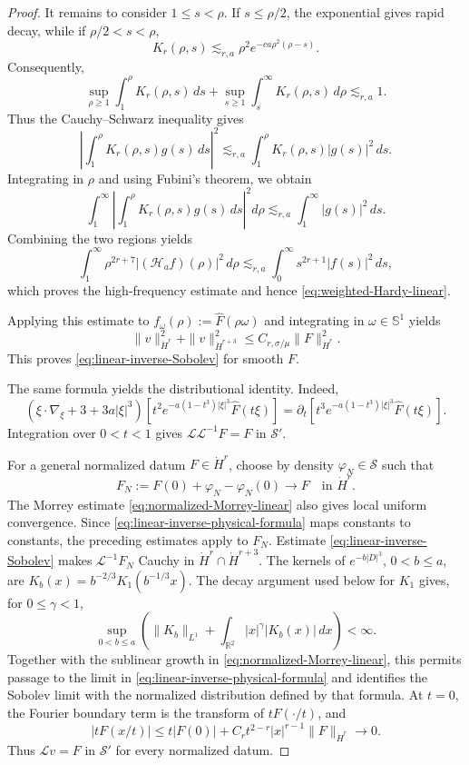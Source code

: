 \documentclass[12pt]{amsart}
\theoremstyle{remark}
\theoremstyle{definition}
\numberwithin{equation}{section}
\newcommand{\R}{\mathbb{R}}
\begin{document}
\begin{proof}
It remains to consider \(1\leq s<\rho\).  
If \(s\leq\rho/2\), the exponential gives rapid decay, while if
\(\rho/2<s<\rho\),
\[
 K_r(\rho,s) \lesssim_{r,a} \rho^2e^{-ca\rho^2(\rho-s)}.
\]
Consequently,
\[
 \sup_{\rho\geq1} \int_1^\rho K_r(\rho,s)\,ds
 + \sup_{s\geq1} \int_s^\infty K_r(\rho,s)\,d\rho \lesssim_{r,a}1.
\]
Thus the Cauchy--Schwarz inequality gives
\[
 \left| \int_1^\rho K_r(\rho,s)g(s)\,ds \right|^2
 \lesssim_{r,a} \int_1^\rho K_r(\rho,s)|g(s)|^2\,ds.
\]
Integrating in \(\rho\) and using Fubini's theorem, we obtain
\[
 \int_1^\infty \left|
  \int_1^\rho K_r(\rho,s)g(s)\,ds
 \right|^2d\rho \lesssim_{r,a} \int_1^\infty|g(s)|^2\,ds.
\]
Combining the two regions yields
\[
 \int_1^\infty \rho^{2r+7}|(\mathcal H_af)(\rho)|^2\,d\rho \lesssim_{r,a} \int_0^\infty s^{2r+1}|f(s)|^2\,ds,
\]
which proves the high-frequency estimate and hence
\eqref{eq:weighted-Hardy-linear}.

Applying this estimate to \(f_\omega(\rho):=\widehat F(\rho\omega)\)
and integrating in \(\omega\in\mathbb S^1\) yields
\[
 \|v\|_{\dot H^r}^2+\|v\|_{\dot H^{r+3}}^2
 \leq C_{r,\sigma/\mu}\|F\|_{\dot H^r}^2.
\]
This proves \eqref{eq:linear-inverse-Sobolev} for smooth \(F\).

The same formula yields the distributional identity. Indeed,
\[
 \left(\xi\cdot\nabla_\xi+3+3a|\xi|^3\right)
 \left[t^2e^{-a(1-t^3)|\xi|^3}\widehat F(t\xi)\right]
 =\partial_t\left[t^3e^{-a(1-t^3)|\xi|^3}\widehat F(t\xi)\right].
\]
Integration over \(0<t<1\) gives
\(\mathcal L\mathcal L^{-1}F=F\) in \(\mathcal S'\).

For a general normalized datum \(F\in\dot H^r\), choose by density
\(\varphi_N\in\mathcal S\) such that
\[
 F_N:=F(0)+\varphi_N-\varphi_N(0)\longrightarrow F
 \quad\text{in }\dot H^r.
\]
The Morrey estimate \eqref{eq:normalized-Morrey-linear} also gives local
uniform convergence. Since \eqref{eq:linear-inverse-physical-formula} maps
constants to constants, the preceding estimates apply to \(F_N\). Estimate
\eqref{eq:linear-inverse-Sobolev} makes
\(\mathcal L^{-1}F_N\) Cauchy in
\(\dot H^r\cap\dot H^{r+3}\). The kernels of
\(e^{-b|D|^3}\), \(0<b\leq a\), are
\(K_b(x)=b^{-2/3}K_1(b^{-1/3}x)\).  The decay argument used below for
\(K_1\) gives, for \(0\leq\gamma<1\),
\[
 \sup_{0<b\leq a}\left(
 \|K_b\|_{L^1}+\int_{\R^2}|x|^\gamma|K_b(x)|\,dx\right)<\infty.
\]
Together with the sublinear growth in \eqref{eq:normalized-Morrey-linear},
this permits passage to the limit in
\eqref{eq:linear-inverse-physical-formula} and identifies the Sobolev limit
with the normalized distribution defined by that formula.
At \(t=0\), the Fourier boundary term is the transform of
\(tF(\cdot/t)\), and
\[
 |tF(x/t)|\leq t|F(0)|+C_rt^{2-r}|x|^{r-1}\|F\|_{\dot H^r}\longrightarrow0.
\]
Thus \(\mathcal Lv=F\) in \(\mathcal S'\) for every normalized datum.


\end{proof}
\end{document}
